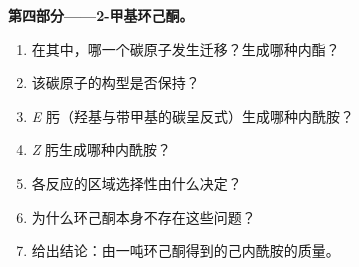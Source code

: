 \begin{problem}
\medskip\noindent\textbf{第四部分——2-甲基环己酮。}
\begin{enumerate}[resume]
  \item 在其中，哪一个碳原子发生迁移？生成哪种内酯？
  \item 该碳原子的构型是否保持？
  \item \textit{E} 肟（羟基与带甲基的碳呈反式）生成哪种内酰胺？
  \item \textit{Z} 肟生成哪种内酰胺？
  \item 各反应的区域选择性由什么决定？
  \item 为什么环己酮本身不存在这些问题？
  \item 给出结论：由一吨环己酮得到的己内酰胺的质量。
\end{enumerate}
\end{problem}
